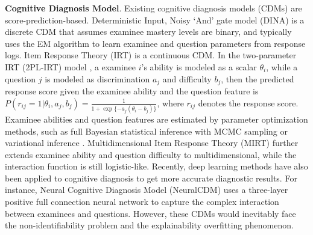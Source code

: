 \documentclass[sigconf]{acmart}
\begin{document}
\par \textbf{Cognitive Diagnosis Model}. Existing cognitive diagnosis models (CDMs) are score-prediction-based. Deterministic Input, Noisy `And' gate model (DINA) \cite{Torre2009} is a discrete CDM that assumes examinee mastery levels are binary, and typically uses the EM algorithm to learn examinee and question parameters from response logs. Item Response Theory (IRT) \cite{Fischer1995,Brzezinska2020} is a continuous CDM. In the two-parameter IRT (2PL-IRT) model \cite{Fischer1995}, a examinee $i$'s ability is modeled as a scalar $\theta_i$, while a question $j$ is modeled as discrimination $a_j$ and difficulty $b_j$, then the predicted response score given the examinee ability and the question feature is $P(r_{ij}=1|\theta_i,a_j,b_j)=\frac{1}{1+\exp\{-a_j(\theta_i-b_j)\}}$, where $r_{ij}$ denotes the response score. Examinee abilities and question features are estimated by parameter optimization methods, such as full Bayesian statistical inference with MCMC sampling \cite{Gelfand1990,Hastings1970} or variational inference \cite{Wu2020}. Multidimensional Item Response Theory (MIRT) \cite{Reckase2009} further extends examinee ability and question difficulty to multidimensional, while the interaction function is still logistic-like. Recently, deep learning methods \cite{Yeung2019, WangF2022} have also been applied to cognitive diagnosis to get more accurate diagnostic results. For instance, Neural Cognitive Diagnosis Model (NeuralCDM) \cite{WangF2022} uses a three-layer positive full connection neural network to capture the complex interaction between examinees and questions.  However, these CDMs would inevitably face the non-identifiability problem and the explainability overfitting phenomenon.
\end{document}
